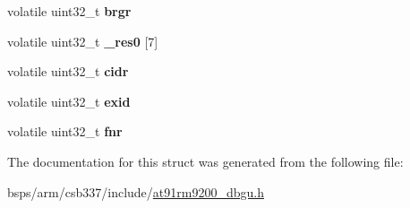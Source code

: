 \begin{DoxyCompactItemize}
\mbox{\label{structat91rm9200__dbgu__regs__t_abfadfee195d91e9fe7154d34a11ed6bd}} 
volatile uint32\+\_\+t {\bfseries brgr}
\item 
\mbox{\label{structat91rm9200__dbgu__regs__t_a4aed1e2cd86f660e801748acd183027b}} 
volatile uint32\+\_\+t {\bfseries \+\_\+res0} \mbox{[}7\mbox{]}
\item 
\mbox{\label{structat91rm9200__dbgu__regs__t_afe7da168fb185075565d0e78af606cd6}} 
volatile uint32\+\_\+t {\bfseries cidr}
\item 
\mbox{\label{structat91rm9200__dbgu__regs__t_aaa6d15b8a58d201eef9fe75424c64731}} 
volatile uint32\+\_\+t {\bfseries exid}
\item 
\mbox{\label{structat91rm9200__dbgu__regs__t_a60cdb41dbf63b89f87246fb827d776b6}} 
volatile uint32\+\_\+t {\bfseries fnr}
\end{DoxyCompactItemize}


The documentation for this struct was generated from the following file\+:\begin{DoxyCompactItemize}
\item 
bsps/arm/csb337/include/\mbox{\hyperlink{at91rm9200__dbgu_8h}{at91rm9200\+\_\+dbgu.\+h}}\end{DoxyCompactItemize}
